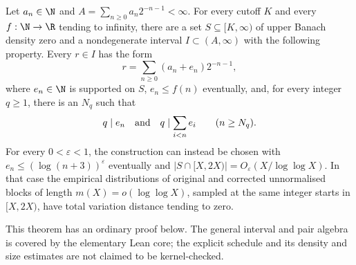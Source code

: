 \documentclass[11pt]{article}
\begin{document}
\begin{theorem}
\label{long251:res:sparse-rationalisation}
Let $a_n\in\N$ and $A=\sum_{n\ge0}a_n2^{-n-1}<\infty$.  For every cutoff
$K$ and every $f:\N\to\R$ tending to infinity, there are a set
$S\subseteq[K,\infty)$ of upper Banach density zero and a nondegenerate
interval $I\subset(A,\infty)$ with the following property.  Every $r\in I$
has the form
\[
 r=\sum_{n\ge0}(a_n+e_n)2^{-n-1},
\]
where $e_n\in\N$ is supported on $S$, $e_n\le f(n)$ eventually, and, for
every integer $q\ge1$, there is an $N_q$ such that
\[
 q\mid e_n\quad\hbox{and}\quad q\mid\sum_{i<n}e_i
 \qquad(n\ge N_q).
\]
For every $0<\varepsilon<1$, the construction can instead be chosen with
$e_n\le(\log(n+3))^\varepsilon$ eventually and
$|S\cap[X,2X)|=O_\varepsilon(X/\log\log X)$.  In that case the empirical
distributions of original and corrected unnormalised blocks of length
$m(X)=o(\log\log X)$, sampled at the same integer starts in $[X,2X)$,
have total variation distance tending to zero.
\end{theorem}

\noindent This theorem has an ordinary proof below.  The general interval
and pair algebra is covered by the elementary Lean core; the explicit
schedule and its density and size estimates are not claimed to be
kernel-checked.
\end{document}
